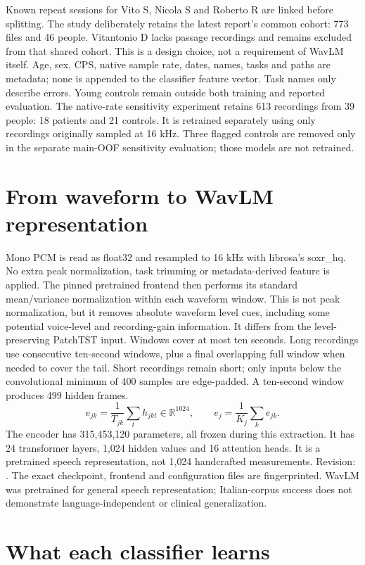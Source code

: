 \documentclass[11pt,a4paper]{article}
\begin{document}
Known repeat sessions for Vito S, Nicola S and Roberto R are linked before splitting.
The study deliberately retains the latest report's common cohort: 773 files and
46 people. Vitantonio D lacks passage recordings and remains excluded from that
shared cohort. This is a design choice, not a requirement of WavLM itself.
Age, sex, CPS, native sample rate, dates, names, tasks and paths are metadata;
none is appended to the classifier feature vector. Task names only describe errors.
Young controls remain outside both training and reported evaluation.
The native-rate sensitivity experiment retains 613 recordings from 39 people:
18 patients and 21 controls. It is retrained separately using only recordings
originally sampled at 16 kHz. Three flagged controls are removed only in the
separate main-OOF sensitivity evaluation; those models are not retrained.
\clearpage\section{From waveform to WavLM representation}
Mono PCM is read as float32 and resampled to 16 kHz with librosa's soxr\_hq.
No extra peak normalization, task trimming or metadata-derived feature is applied.
The pinned pretrained frontend then performs its standard mean/variance
normalization within each waveform window. This is not peak normalization,
but it removes absolute waveform level cues, including some potential voice-level
and recording-gain information. It differs from the level-preserving PatchTST input.
Windows cover at most ten seconds. Long recordings use consecutive ten-second
windows, plus a final overlapping full window when needed to cover the tail.
Short recordings remain short; only inputs below the convolutional minimum of
400 samples are edge-padded. A ten-second window produces 499 hidden frames.
\[
e_{jk}=\frac{1}{T_{jk}}\sum_t h_{jkt}\in\mathbb R^{1024},\qquad
e_j=\frac{1}{K_j}\sum_k e_{jk}.
\]
The encoder has 315,453,120 parameters, all frozen during this extraction.
It has 24 transformer layers, 1,024 hidden values and 16 attention heads.
It is a pretrained speech representation, not 1,024 handcrafted measurements.
Revision: .
The exact checkpoint, frontend and configuration files are fingerprinted.
WavLM was pretrained for general speech representation; Italian-corpus success
does not demonstrate language-independent or clinical generalization.
\clearpage\section{What each classifier learns}
\end{document}
